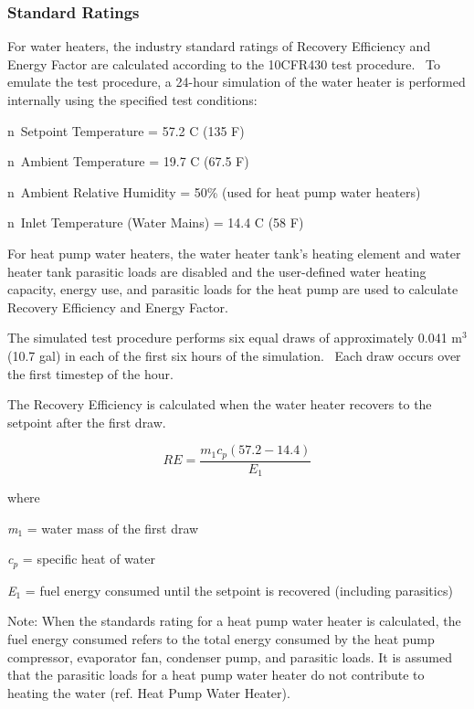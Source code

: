\subsubsection{Standard Ratings}\label{standard-ratings-000}

For water heaters, the industry standard ratings of Recovery Efficiency and Energy Factor are calculated according to the 10CFR430 test procedure.~ To emulate the test procedure, a 24-hour simulation of the water heater is performed internally using the specified test conditions:

n~Setpoint Temperature = 57.2 C (135 F)

n~Ambient Temperature = 19.7 C (67.5 F)

n~Ambient Relative Humidity = 50\% (used for heat pump water heaters)

n~Inlet Temperature (Water Mains) = 14.4 C (58 F)

For heat pump water heaters, the water heater tank's heating element and water heater tank parasitic loads are disabled and the user-defined water heating capacity, energy use, and parasitic loads for the heat pump are used to calculate Recovery Efficiency and Energy Factor.

The simulated test procedure performs six equal draws of approximately 0.041 m\(^{3}\) (10.7 gal) in each of the first six hours of the simulation.~ Each draw occurs over the first timestep of the hour.

The Recovery Efficiency is calculated when the water heater recovers to the setpoint after the first draw.

\begin{equation}
RE = \frac{{{m_1}{c_p}\left( {57.2 - 14.4} \right)}}{{{E_1}}}
\end{equation}

where

\emph{m\(_{1}\)} = water mass of the first draw

\emph{c\(_{p}\)} = specific heat of water

\emph{E\(_{1}\)} = fuel energy consumed until the setpoint is recovered (including parasitics)

Note: When the standards rating for a heat pump water heater is calculated, the fuel energy consumed refers to the total energy consumed by the heat pump compressor, evaporator fan, condenser pump, and parasitic loads. It is assumed that the parasitic loads for a heat pump water heater do not contribute to heating the water (ref. Heat Pump Water Heater).

